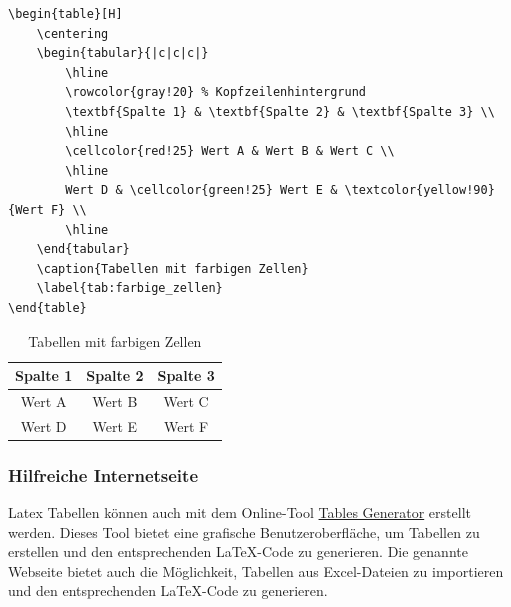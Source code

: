 \begin{minipage}{0.69\textwidth}
    \begin{lstlisting}[language={[LaTeX]TeX}, basicstyle=\small]
\begin{table}[H]
    \centering
    \begin{tabular}{|c|c|c|}
        \hline
        \rowcolor{gray!20} % Kopfzeilenhintergrund
        \textbf{Spalte 1} & \textbf{Spalte 2} & \textbf{Spalte 3} \\
        \hline
        \cellcolor{red!25} Wert A & Wert B & Wert C \\
        \hline
        Wert D & \cellcolor{green!25} Wert E & \textcolor{yellow!90}{Wert F} \\
        \hline
    \end{tabular}
    \caption{Tabellen mit farbigen Zellen}
    \label{tab:farbige_zellen}
\end{table}
    \end{lstlisting}
\end{minipage}
\hfill
\begin{minipage}{0.29\textwidth}
    \begin{table}[H]
        \centering
        \begin{tabular}{|c|c|c|}
            \hline
            \rowcolor{gray!20} %
            \textbf{Spalte 1}         & \textbf{Spalte 2}           & \textbf{Spalte 3}             \\
            \hline
            \cellcolor{red!25} Wert A & Wert B                      & Wert C                        \\
            \hline
            Wert D                    & \cellcolor{green!25} Wert E & \textcolor{yellow!90}{Wert F} \\
            \hline
        \end{tabular}
        \caption{Tabellen mit farbigen Zellen}
        \label{tab:farbige_zellen}
    \end{table}
\end{minipage}


\subsubsection{Hilfreiche Internetseite}
Latex Tabellen können auch mit dem Online-Tool \href{https://tablesgenerator.com/latex_tables}{Tables Generator} erstellt werden. Dieses Tool bietet eine grafische Benutzeroberfläche, um Tabellen zu erstellen und den entsprechenden \LaTeX-Code zu generieren. Die genannte Webseite bietet auch die Möglichkeit, Tabellen aus Excel-Dateien zu importieren und den entsprechenden \LaTeX-Code zu generieren.

